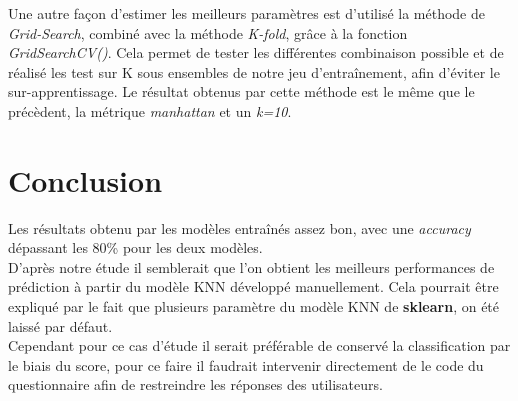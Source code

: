 \documentclass[french]{article}
\begin{document}
Une autre façon d'estimer les meilleurs paramètres est d'utilisé la méthode de \textit{Grid-Search}, combiné avec la méthode \textit{K-fold}, grâce à la fonction \textit{GridSearchCV()}. Cela permet de tester les différentes combinaison possible et de réalisé les test sur K sous ensembles de notre jeu d'entraînement, afin d'éviter le sur-apprentissage. Le résultat obtenus par cette méthode est le même que le précèdent, la métrique \textit{manhattan} et un \textit{k=10}.


\section{Conclusion}

Les résultats obtenu par les modèles entraînés assez bon, avec une \textit{accuracy} dépassant les 80\% pour les deux modèles.\\

D'après notre étude il semblerait que l'on obtient les meilleurs performances de prédiction à partir du modèle KNN développé manuellement. Cela pourrait être expliqué par le fait que plusieurs paramètre du modèle KNN de \textbf{sklearn}, on été laissé par défaut.\\

Cependant pour ce cas d'étude il serait préférable de conservé la classification par le biais du score, pour ce faire il faudrait intervenir directement de le code du questionnaire afin de restreindre les réponses des utilisateurs.
\end{document}
